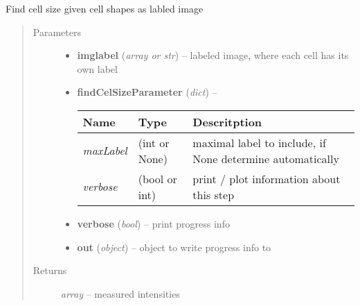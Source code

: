 \documentclass[letterpaper,10pt,english]{sphinxmanual}
\begin{document}

\begin{fulllineitems}
\label{api/ClearMap.ImageProcessing:ClearMap.ImageProcessing.CellSizeDetection.findCellSize}
Find cell size given cell shapes as labled image
\begin{quote}\begin{description}
\item[{Parameters}] \leavevmode\begin{itemize}
\item {} 
\textbf{imglabel} (\emph{array or str}) --
labeled image, where each cell has its own label

\item {} 
\textbf{findCelSizeParameter} (\emph{dict}) --

\begin{tabulary}{\linewidth}{|L|L|L|}
\hline
\textsf{\relax 
Name
} & \textsf{\relax 
Type
} & \textsf{\relax 
Descritption
}\\
\hline
\emph{maxLabel}
 & 
(int or None)
 & 
maximal label to include, if None determine automatically
\\
\hline
\emph{verbose}
 & 
(bool or int)
 & 
print / plot information about this step
\\
\hline\end{tabulary}


\item {} 
\textbf{verbose} (\emph{bool}) --
print progress info

\item {} 
\textbf{out} (\emph{object}) --
object to write progress info to

\end{itemize}

\item[{Returns}] \leavevmode
\emph{array} --
measured intensities

\end{description}\end{quote}

\end{fulllineitems}

\end{document}
